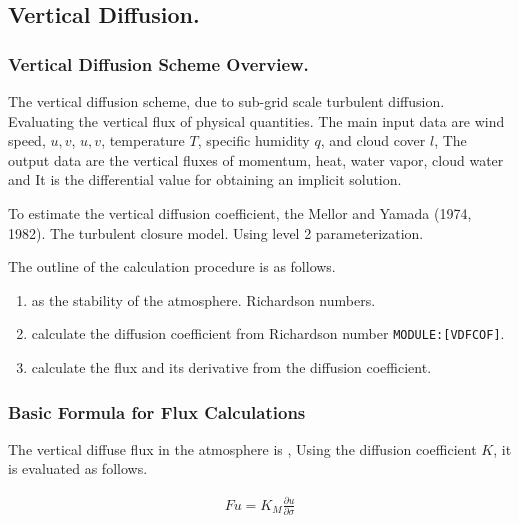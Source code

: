 \hypertarget{vertical-diffusion.}{%
\subsection{Vertical Diffusion.}\label{vertical-diffusion.}}

\hypertarget{vertical-diffusion-scheme-overview.}{%
\subsubsection{Vertical Diffusion Scheme
Overview.}\label{vertical-diffusion-scheme-overview.}}

The vertical diffusion scheme, due to sub-grid scale turbulent
diffusion. Evaluating the vertical flux of physical quantities. The main
input data are wind speed, \(u, v\), \(u, v\), temperature \(T\),
specific humidity \(q\), and cloud cover \(l\), The output data are the
vertical fluxes of momentum, heat, water vapor, cloud water and It is
the differential value for obtaining an implicit solution.

To estimate the vertical diffusion coefficient, the Mellor and Yamada
(1974, 1982). The turbulent closure model. Using level 2
parameterization.

The outline of the calculation procedure is as follows.

\begin{enumerate}
\def\labelenumi{\arabic{enumi}.}
\item
  as the stability of the atmosphere. Richardson numbers.
\item
  calculate the diffusion coefficient from Richardson number
  \texttt{MODULE:{[}VDFCOF{]}}.
\item
  calculate the flux and its derivative from the diffusion coefficient.
\end{enumerate}

\hypertarget{basic-formula-for-flux-calculations}{%
\subsubsection{Basic Formula for Flux
Calculations}\label{basic-formula-for-flux-calculations}}

The vertical diffuse flux in the atmosphere is , Using the diffusion
coefficient \(K\), it is evaluated as follows.

\begin{eqnarray}
  F{u} = K_{M} \frac{\partial u}{\partial \sigma} 
\end{eqnarray}

